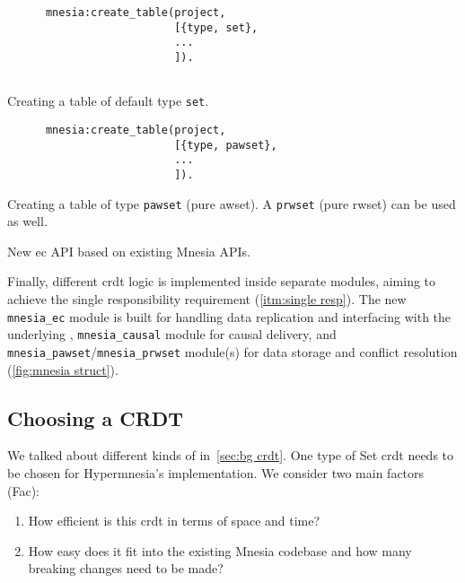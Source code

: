 \begin{listing}[htp]
  \begin{sublisting}[t]{0.46\linewidth}
    \begin{verbatim}
      mnesia:create_table(project,
                          [{type, set},
                          ...
                          ]).
                          
    \end{verbatim}
    \caption{Creating a table of default type \texttt{set}.}
    \label{lst:mnesia create table}
  \end{sublisting}
  \hfill
  \begin{sublisting}[t]{0.46\linewidth}
    \begin{verbatim}
      mnesia:create_table(project,
                          [{type, pawset},
                          ...
                          ]).
    \end{verbatim}
    \caption{Creating a table of type \texttt{pawset} (pure \acrlong{awset}).
    A \texttt{prwset} (pure \acrlong{rwset}) can be used as well.}
    \label{lst:hypermnesia create table}
  \end{sublisting}
  \caption{New \acrfull{ec} API based on existing Mnesia APIs.} 
  \label{lst:mnesia ec create table}
\end{listing}

Finally, different \acrshort{crdt} logic is implemented inside separate modules,
aiming to achieve the single responsibility requirement (\cref{itm:single resp}).
The new \verb|mnesia_ec| module is built for handling data replication and
interfacing with the underlying , \verb|mnesia_causal| module for
causal delivery, and \verb|mnesia_pawset|/\verb|mnesia_prwset| module(s) for
data storage and conflict resolution (\cref{fig:mnesia struct}).

\subsection{Choosing a CRDT} \label{subsec:design choose crdt}

We talked about different kinds of  in~\cref{sec:bg crdt}.
One type of Set \acrshort{crdt} needs to be chosen for Hypermnesia's implementation. 
We consider two main factors (Fac):

\begin{enumerate} [label={Fac\arabic*.},ref={Fac\arabic*}]
  \item How efficient is this \acrshort{crdt} in terms of space and time?
  \item How easy does it fit into the existing Mnesia codebase
  and how many breaking changes need to be made? \label{itm:code change}
\end{enumerate}

